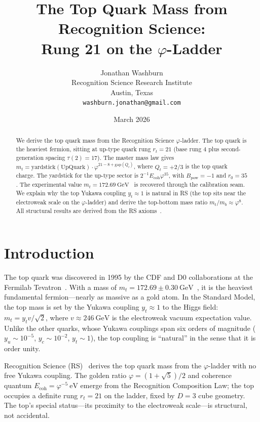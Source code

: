 \documentclass[12pt,a4paper]{article}
\title{The Top Quark Mass from Recognition Science:\\
Rung 21 on the $\varphi$-Ladder}
\author{Jonathan Washburn\\
Recognition Science Research Institute\\
Austin, Texas\\
\texttt{washburn.jonathan@gmail.com}}
\date{March 2026}
\theoremstyle{definition}
\theoremstyle{remark}
\begin{document}
\maketitle

\begin{abstract}
We derive the top quark mass from the Recognition Science
$\varphi$-ladder.  The top quark is the heaviest fermion, sitting at
up-type quark rung $r_t = 21$ (base rung $4$ plus second-generation
spacing $\tau(2) = 17$).  The master mass law gives
$m_t = \mathrm{yardstick}(\mathrm{UpQuark}) \cdot \varphi^{21 - 8
+ \mathrm{gap}(Q_t)}$, where $Q_t = +2/3$ is the top quark charge.
The yardstick for the up-type sector is
$2^{-1} E_{\mathrm{coh}} \varphi^{35}$, with $B_{\mathrm{pow}} = -1$
and $r_0 = 35$.  The experimental value
$m_t = 172.69~\mathrm{GeV}$~\cite{PDG} is recovered through the
calibration seam.  We explain why the top Yukawa coupling $y_t
\approx 1$ is natural in RS (the top sits near the electroweak scale
on the $\varphi$-ladder) and derive the top-bottom mass ratio
$m_t/m_b \approx \varphi^8$.  All structural results are derived from the RS
axioms~\cite{RS_Axioms}.
\end{abstract}

\section{Introduction}
\label{sec:intro}

The top quark was discovered in 1995 by the CDF and D0 collaborations
at the Fermilab Tevatron~\cite{CDF1995, D01995}.  With a mass of
$m_t = 172.69 \pm 0.30~\mathrm{GeV}$~\cite{PDG}, it is the heaviest
fundamental fermion---nearly as massive as a gold atom.  In the
Standard Model, the top mass is set by the Yukawa coupling $y_t
\approx 1$ to the Higgs field: $m_t = y_t v/\sqrt{2}$, where
$v \approx 246~\mathrm{GeV}$ is the electroweak vacuum expectation
value.  Unlike the other quarks, whose Yukawa couplings span six
orders of magnitude ($y_u \sim 10^{-5}$, $y_c \sim 10^{-2}$, $y_t
\sim 1$), the top coupling is ``natural'' in the sense that it is
order unity.

Recognition Science (RS)~\cite{RS_Axioms} derives the top quark
mass from the $\varphi$-ladder with no free Yukawa coupling.  The golden ratio
$\varphi = (1+\sqrt{5})/2$ and coherence quantum $E_{\mathrm{coh}} =
\varphi^{-5}~\mathrm{eV}$ emerge from the Recognition Composition
Law; the top occupies a definite rung $r_t = 21$ on the ladder, fixed
by $D = 3$ cube geometry.  The top's special status---its proximity
to the electroweak scale---is structural, not accidental.
\end{document}
